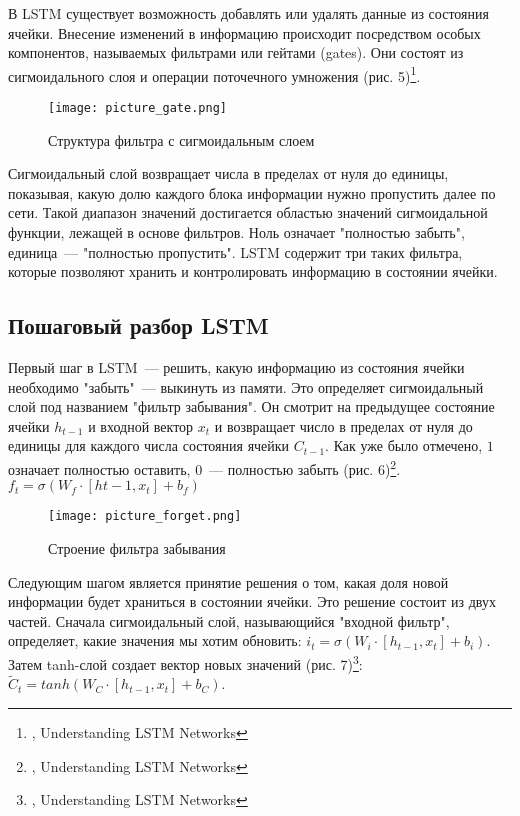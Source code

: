 \documentclass[12pt, a4paper]{article}
\begin{document}
В LSTM существует возможность добавлять или удалять данные из состояния ячейки. Внесение изменений в информацию происходит посредством особых компонентов, называемых фильтрами или гейтами (gates). Они состоят из сигмоидального слоя и операции поточечного умножения (рис. 5)\footnote{\cite{Colah}, Understanding LSTM Networks}.

\begin{wrapfigure}{r}{0.25\textwidth}
    \centering
    \texttt{[image: picture\_gate.png]}
		\caption{Структура фильтра с сигмоидальным слоем}
\end{wrapfigure}

Сигмоидальный слой возвращает числа в пределах от нуля до единицы, показывая, какую долю каждого блока информации нужно пропустить далее по сети. Такой диапазон значений достигается областью значений сигмоидальной функции, лежащей в основе фильтров. Ноль означает "полностью забыть", единица~--- "полностью пропустить". LSTM содержит три таких фильтра, которые позволяют хранить и контролировать информацию в состоянии ячейки.\\

\subsection{Пошаговый разбор LSTM}

Первый шаг в LSTM~--- решить, какую информацию из состояния ячейки необходимо "забыть"~--- выкинуть из памяти. Это определяет сигмоидальный слой под названием "фильтр забывания". Он смотрит на предыдущее состояние ячейки $h_{t-1}$ и входной вектор $x_t$ и возвращает число в пределах от нуля до единицы для каждого числа состояния ячейки $C_{t-1}$. Как уже было отмечено, $1$ означает полностью оставить, $0$~--- полностью забыть (рис. 6)\footnote{\cite{Colah}, Understanding LSTM Networks}. $f_t = \sigma(W_f \cdot [h{t-1}, x_t] + b_f)$ \\

\begin{figure}[h]
    \centering
    \texttt{[image: picture\_forget.png]}
		\caption{Строение фильтра забывания}
\end{figure}

Следующим шагом является принятие решения о том, какая доля новой информации будет храниться в состоянии ячейки. Это решение состоит из двух частей. Сначала сигмоидальный слой, называющийся "входной фильтр", определяет, какие значения мы хотим обновить: $i_t = \sigma(W_i \cdot [h_{t-1}, x_t] + b_i)$. Затем tanh-слой создает вектор новых значений (рис. 7)\footnote{\cite{Colah}, Understanding LSTM Networks}: $\tilde C_t = tanh(W_C \cdot [h_{t-1}, x_t] + b_C)$. \\
\end{document}
